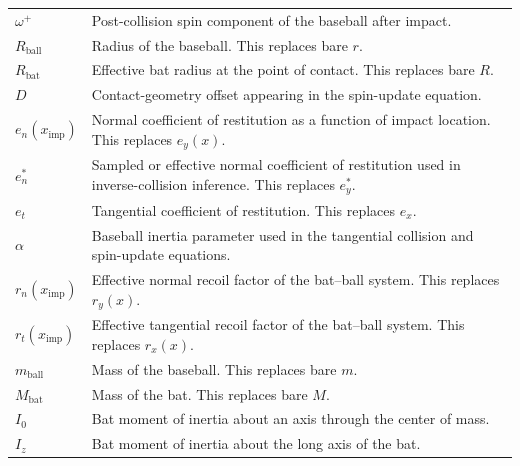 \documentclass[11pt]{article}
\begin{document}
\begin{scriptsize}
\begin{longtable}{>{\raggedright\arraybackslash}p{}
                  >{\raggedright\arraybackslash}p{}}
\(\omega^{+}\) 
& Post-collision spin component of the baseball after impact. \\

\(R_{\mathrm{ball}}\) 
& Radius of the baseball. This replaces bare \(r\). \\

\(R_{\mathrm{bat}}\) 
& Effective bat radius at the point of contact. This replaces bare \(R\). \\

\(D\) 
& Contact-geometry offset appearing in the spin-update equation. \\

\(e_n(x_{\mathrm{imp}})\) 
& Normal coefficient of restitution as a function of impact location. This replaces \(e_y(x)\). \\

\(e_n^{\ast}\) 
& Sampled or effective normal coefficient of restitution used in inverse-collision inference. This replaces \(e_y^{\ast}\). \\

\(e_t\) 
& Tangential coefficient of restitution. This replaces \(e_x\). \\

\(\alpha\) 
& Baseball inertia parameter used in the tangential collision and spin-update equations. \\

\(r_n(x_{\mathrm{imp}})\) 
& Effective normal recoil factor of the bat--ball system. This replaces \(r_y(x)\). \\

\(r_t(x_{\mathrm{imp}})\) 
& Effective tangential recoil factor of the bat--ball system. This replaces \(r_x(x)\). \\

\(m_{\mathrm{ball}}\) 
& Mass of the baseball. This replaces bare \(m\). \\

\(M_{\mathrm{bat}}\) 
& Mass of the bat. This replaces bare \(M\). \\

\(I_0\) 
& Bat moment of inertia about an axis through the center of mass. \\

\(I_z\) 
& Bat moment of inertia about the long axis of the bat. \\

\end{longtable}
\end{scriptsize}
\end{document}
